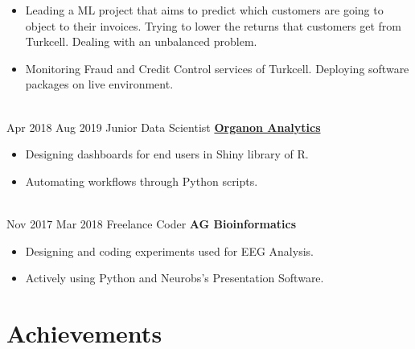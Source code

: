 \documentclass[letterpaper]{DS_class_file} %
\begin{document}
\begin{twenty}
{\begin{itemize}
			\item Leading a ML project that aims to predict which customers are going to object to their invoices. Trying to lower the returns that customers get from Turkcell. Dealing with an unbalanced problem.
			\item Monitoring Fraud and Credit Control services of Turkcell. Deploying software packages on live environment.
		\end{itemize}}
		\\
	\twentyitem
		{Apr 2018}
		{Aug 2019}
		{\hspace{0.3cm}Junior Data Scientist}
		{\href{http://www.organonanalytics.com/pages/index.php}{\textbf{Organon Analytics}}}
		{}
		{\begin{itemize}
			\item Designing dashboards for end users in Shiny library of R.
			\item Automating workflows through Python scripts.
		\end{itemize}}
		\\
	\twentyitem
    	{Nov 2017}
		{Mar 2018}
        {\hspace{0.3cm}Freelance Coder}
        {\textbf{AG Bioinformatics}}
        {}
        {\begin{itemize}
        \item Designing and coding experiments used for EEG Analysis.
        \item Actively using Python and Neurobs's Presentation Software.
        \end{itemize}}
\end{twenty}

\section{Achievements}
\end{document}
